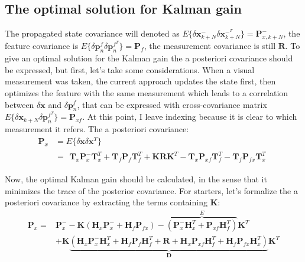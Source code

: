 \subsection{The optimal solution for Kalman gain}

The propagated state covariance will denoted as $E\{\delta\mathbf{x}_{k+N}^-\delta\mathbf{x}_{k+N}^{-^T}\}=\mathbf{P}_{x,k+N}^-$, the feature covariance is $E\{\delta\mathbf{p}_n^f\delta\mathbf{p}_n^{f^T}\}=\mathbf{P}_f$, the measurement covariance is still $\mathbf{R}$. To give an optimal solution for the Kalman gain the a posteriori covariance should be expressed, but first, let's take some considerations. When a visual measurement was taken, the current approach updates the state first, then optimizes the feature with the same measurement which leads to a correlation between $\delta\mathbf{x}$ and $\delta\mathbf{p}_{n}^f$, that can be expressed with cross-covariance matrix $E\{\delta\mathbf{x}_{k+N} \delta\mathbf{p}_n^{f^T}\}=\mathbf{P}_{xf}$. At this point, I leave indexing because it is clear to which measurement it refers. The a posteriori covariance:
\begin{equation}
\begin{aligned}
    \mathbf{P}_x &=E\{\delta\mathbf{x}\delta\mathbf{x}^T\} \\ &=
    \begin{aligned}
    \mathbf{T}_x\mathbf{P}_x^-\mathbf{T}_x^T+\mathbf{T}_f\mathbf{P}_f\mathbf{T}_f^T +
    \mathbf{K}\mathbf{R}\mathbf{K}^T - \mathbf{T}_x\mathbf{P}_{xf}\mathbf{T}_f^T - \mathbf{T}_f\mathbf{P}_{fx}\mathbf{T}_x^T
    \end{aligned}
\end{aligned}
\end{equation}

Now, the optimal Kalman gain should be calculated, in the sense that it minimizes the trace of the posterior covariance. For starters, let's formalize the a posteriori covariance by extracting the terms containing $\mathbf{K}$:
\begin{equation}
\begin{aligned}
    \mathbf{P}_x =& \mathbf{P}_x^--\mathbf{K}\left(\mathbf{H}_{x}\mathbf{P}_{x}^-+\mathbf{H}_{f}\mathbf{P}_{fx}\right) -
    \overbrace{\left(\mathbf{P}_{x}^-\mathbf{H}_{x}^T + \mathbf{P}_{xf}\mathbf{H}_{f}^T\right)}^{E}\mathbf{K}^T \\ & +
    \mathbf{K}\underbrace{\left(\mathbf{H}_{x}\mathbf{P}_{x}^-\mathbf{H}_{x}^T +\mathbf{H}_{f}\mathbf{P}_f\mathbf{H}_{f}^T+\mathbf{R} + \mathbf{H}_{x}\mathbf{P}_{xf}\mathbf{H}_f^T+\mathbf{H}_{f}\mathbf{P}_{fx}\mathbf{H}_x^T\right)}_{\mathbf{D}}\mathbf{K}^T
\end{aligned}
\end{equation}

